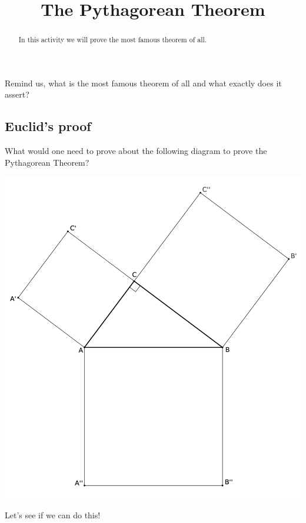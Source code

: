 \documentclass{ximera}
\title{The Pythagorean Theorem}
\begin{document}
\begin{abstract}
In this activity we will prove the most famous theorem of
  all.
\end{abstract}
\maketitle



\begin{question}
Remind us, what is the most famous theorem of all and what exactly
does it assert?
\end{question}


\subsection{Euclid's proof}


\begin{question} 
What would one need to prove about the following diagram to prove the
Pythagorean Theorem?
\begin{image}
\includegraphics{PythEuclid.png}
\end{image}
\end{question}

Let's see if we can do this!
\end{document}
